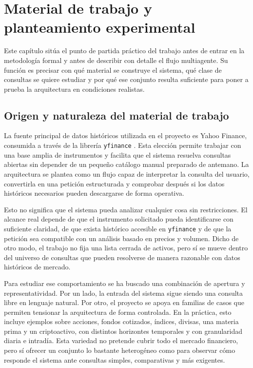 \chapter{Material de trabajo y planteamiento experimental}

Este cap\'itulo sit\'ua el punto de partida pr\'actico del trabajo antes de entrar en la metodolog\'ia formal y antes de describir con detalle el flujo multiagente. Su 
funci\'on es precisar con qu\'e material se construye el sistema, qu\'e clase de consultas se quiere estudiar y por qu\'e ese conjunto resulta suficiente para poner a 
prueba la arquitectura en condiciones realistas.

\section{Origen y naturaleza del material de trabajo}

La fuente principal de datos hist\'oricos utilizada en el proyecto es Yahoo Finance, consumida a trav\'es de la librer\'ia \texttt{yfinance} \cite{yfinance,yahoofinancehistorical}. 
Esta elecci\'on permite trabajar con una base amplia de instrumentos y facilita que el sistema resuelva consultas abiertas sin depender de un peque\~no cat\'alogo manual 
preparado de antemano. La arquitectura se plantea como un flujo capaz de interpretar la consulta del usuario, convertirla en una petici\'on estructurada y comprobar 
despu\'es si los datos hist\'oricos necesarios pueden descargarse de forma operativa.

Esto no significa que el sistema pueda analizar cualquier cosa sin restricciones. El alcance real depende de que el instrumento solicitado pueda identificarse con 
suficiente claridad, de que exista hist\'orico accesible en \texttt{yfinance} y de que la petici\'on sea compatible con un an\'alisis basado en precios y volumen. 
Dicho de otro modo, el trabajo no fija una lista cerrada de activos, pero s\'i se mueve dentro del universo de consultas que pueden resolverse de manera razonable con 
datos hist\'oricos de mercado.

Para estudiar ese comportamiento se ha buscado una combinaci\'on de apertura y representatividad. Por un lado, la entrada del sistema sigue siendo una consulta libre en 
lenguaje natural. Por otro, el proyecto se apoya en familias de casos que permiten tensionar la arquitectura de forma controlada. En la pr\'actica, esto incluye ejemplos
sobre acciones, fondos cotizados, \'indices, divisas, una materia prima y un criptoactivo, con distintos horizontes temporales y con granularidad diaria e intrad\'ia. 
Esta variedad no pretende cubrir todo el mercado financiero, pero s\'i ofrecer un conjunto lo bastante heterog\'eneo como para observar c\'omo responde el sistema ante 
consultas simples, comparativas y m\'as exigentes.

